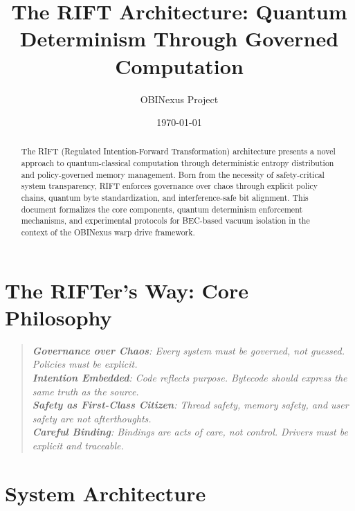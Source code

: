\documentclass[12pt]{article}
\title{The RIFT Architecture: Quantum Determinism Through Governed Computation}
\author{OBINexus Project}
\date{\today}
\newenvironment{hodos}{\begin{quote}\itshape}{\end{quote}}
\begin{document}
\maketitle

\begin{abstract}
The RIFT (Regulated Intention-Forward Transformation) architecture presents a novel approach to quantum-classical computation through deterministic entropy distribution and policy-governed memory management. Born from the necessity of safety-critical system transparency, RIFT enforces governance over chaos through explicit policy chains, quantum byte standardization, and interference-safe bit alignment. This document formalizes the core components, quantum determinism enforcement mechanisms, and experimental protocols for BEC-based vacuum isolation in the context of the OBINexus warp drive framework.
\end{abstract}

\section{The RIFTer's Way: Core Philosophy}
\begin{hodos}
\textbf{Governance over Chaos}: Every system must be governed, not guessed. Policies must be explicit.\\[0.5em]
\textbf{Intention Embedded}: Code reflects purpose. Bytecode should express the same truth as the source.\\[0.5em]
\textbf{Safety as First-Class Citizen}: Thread safety, memory safety, and user safety are not afterthoughts.\\[0.5em]
\textbf{Careful Binding}: Bindings are acts of care, not control. Drivers must be explicit and traceable.
\end{hodos}

\section{System Architecture}
\end{document}
